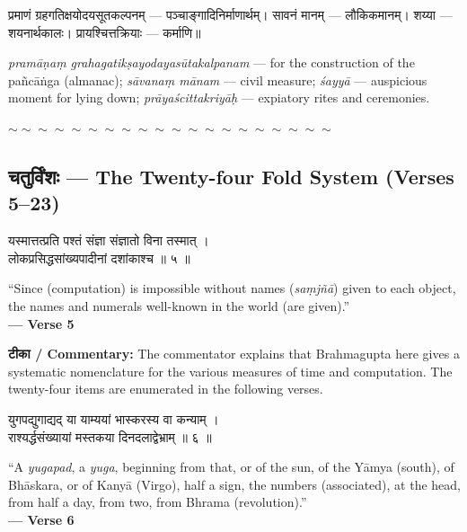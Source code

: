 \documentclass[11pt,a4paper]{article}
\newcommand{\dev}[1]{{\devanagarifont #1}}
\newenvironment{bilingualverse}{%
  \begin{paracol}{2}
  \fontsize{10.5}{13}\selectfont
}{%
  \end{paracol}
  \vspace{0.3cm}
}
\newcommand{\wavydivider}{\begin{center}$\sim\sim\sim\sim\sim\sim\sim\sim\sim\sim\sim\sim\sim\sim\sim\sim\sim\sim\sim\sim$\end{center}}
\newenvironment{paracol}[1]{\begingroup}{\endgroup}
\newenvironment{leftcolumn*}{\begingroup}{\endgroup}
\newenvironment{rightcolumn}{\begingroup}{\endgroup}
\begin{document}
\begin{paracol}{2}
\begin{leftcolumn*}
\dev{प्रमाणं ग्रहगतिक्षयोदयसूतकल्पनम्} — पञ्चाङ्गादिनिर्माणार्थम्। \dev{सावनं मानम्} — लौकिकमानम्। \dev{शय्या} — शयनार्थकालः। \dev{प्रायश्चित्तक्रियाः} — कर्माणि॥
\end{leftcolumn*}
\begin{rightcolumn}
\textit{pramāṇaṃ grahagatikṣayodayasūtakalpanam} --- for the construction of the pañcāṅga (almanac); \textit{sāvanaṃ mānam} --- civil measure; \textit{śayyā} --- auspicious moment for lying down; \textit{prāyaścittakriyāḥ} --- expiatory rites and ceremonies.
\end{rightcolumn}
\end{paracol}

\wavydivider

\subsection*{\dev{चतुर्विंशः} — The Twenty-four Fold System (Verses 5--23)}

\begin{bilingualverse}
\begin{leftcolumn*}
\dev{यस्मात्तत्प्रति पश्तं संज्ञा संज्ञातो विना तस्मात् ।}\\
\dev{लोकप्रसिद्धसांख्यपादीनां दशांकाश्च ॥ ५ ॥}
\end{leftcolumn*}
\begin{rightcolumn}
``Since (computation) is impossible without names (\textit{saṃjñā}) given to each object, the names and numerals well-known in the world (are given).''\\[0.3cm]
\hfill\textbf{— Verse 5}
\end{rightcolumn}
\end{bilingualverse}

\textbf{\dev{टीका} / Commentary:} The commentator explains that Brahmagupta here gives a systematic nomenclature for the various measures of time and computation. The twenty-four items are enumerated in the following verses.

\vspace{0.3cm}

\begin{bilingualverse}
\begin{leftcolumn*}
\dev{युगपद्युगाद्यद् या याम्ययां भास्करस्य वा कन्याम् ।}\\
\dev{राश्यर्द्धसंख्यायां मस्तकया दिनदलाद्वेभ्राम् ॥ ६ ॥}
\end{leftcolumn*}
\begin{rightcolumn}
``A \textit{yugapad}, a \textit{yuga}, beginning from that, or of the sun, of the Yāmya (south), of Bhāskara, or of Kanyā (Virgo), half a sign, the numbers (associated), at the head, from half a day, from two, from Bhrama (revolution).''\\[0.3cm]
\hfill\textbf{— Verse 6}
\end{rightcolumn}
\end{bilingualverse}
\end{document}
